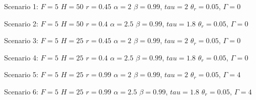 \item Scenario 1: \(F=5\) \(H=50\)  \(r=0.45\) \(\alpha=2\) \(\beta=0.99\), \(tau=2\) \(\theta_r=0.05\), \(\Gamma=0\)
\item Scenario 2: \(F=5\) \(H=50\)  \(r=0.4\) \(\alpha=2.5\) \(\beta=0.99\), \(tau=1.8\) \(\theta_r=0.05\), \(\Gamma=0\)
\item Scenario 3: \(F=5\) \(H=25\)  \(r=0.45\) \(\alpha=2\) \(\beta=0.99\), \(tau=2\) \(\theta_r=0.05\), \(\Gamma=0\)
\item Scenario 4: \(F=5\) \(H=25\)  \(r=0.4\) \(\alpha=2.5\) \(\beta=0.99\), \(tau=1.8\) \(\theta_r=0.05\), \(\Gamma=0\)
\item Scenario 5: \(F=5\) \(H=25\)  \(r=0.99\) \(\alpha=2\) \(\beta=0.99\), \(tau=2\) \(\theta_r=0.05\), \(\Gamma=4\)
\item Scenario 6: \(F=5\) \(H=25\)  \(r=0.99\) \(\alpha=2.5\) \(\beta=0.99\), \(tau=1.8\) \(\theta_r=0.05\), \(\Gamma=4\)
